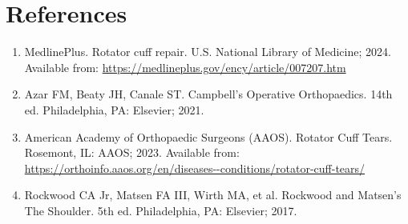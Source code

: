 \section*{References}
\begin{enumerate}
  \item MedlinePlus. Rotator cuff repair. U.S. National Library of Medicine; 2024. Available from: \url{https://medlineplus.gov/ency/article/007207.htm}
  \item Azar FM, Beaty JH, Canale ST. Campbell's Operative Orthopaedics. 14th ed. Philadelphia, PA: Elsevier; 2021.
  \item American Academy of Orthopaedic Surgeons (AAOS). Rotator Cuff Tears. Rosemont, IL: AAOS; 2023. Available from: \url{https://orthoinfo.aaos.org/en/diseases--conditions/rotator-cuff-tears/}
  \item Rockwood CA Jr, Matsen FA III, Wirth MA, et al. Rockwood and Matsen's The Shoulder. 5th ed. Philadelphia, PA: Elsevier; 2017.
\end{enumerate}

\clearpage
